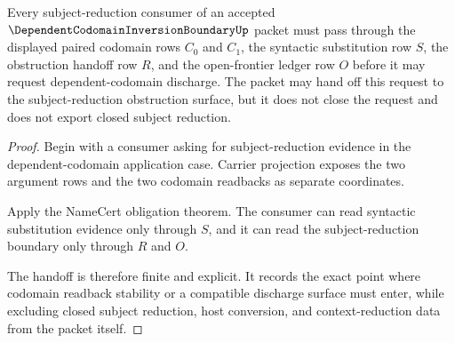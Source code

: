 \begin{theorem}
\label{thm:dependent-codomain-inversion-boundary-subject-reduction-handoff}
Every subject-reduction consumer of an accepted $\DependentCodomainInversionBoundaryUp$ packet must pass through the displayed paired codomain rows $C_0$ and $C_1$, the syntactic substitution row $S$, the obstruction handoff row $R$, and the open-frontier ledger row $O$ before it may request dependent-codomain discharge. The packet may hand off this request to the subject-reduction obstruction surface, but it does not close the request and does not export closed subject reduction.
\end{theorem}
\begin{proof}
Begin with a consumer asking for subject-reduction evidence in the dependent-codomain application case. Carrier projection exposes the two argument rows and the two codomain readbacks as separate coordinates.

Apply the NameCert obligation theorem. The consumer can read syntactic substitution evidence only through $S$, and it can read the subject-reduction boundary only through $R$ and $O$.

The handoff is therefore finite and explicit. It records the exact point where codomain readback stability or a compatible discharge surface must enter, while excluding closed subject reduction, host conversion, and context-reduction data from the packet itself.
\end{proof}


